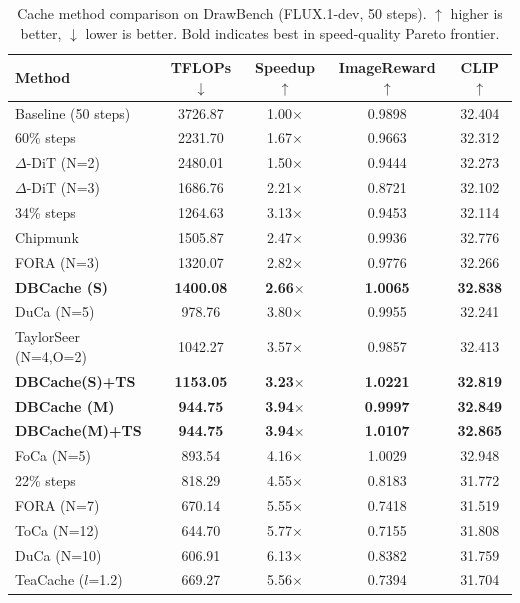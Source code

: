 \documentclass[10pt]{article}
\begin{document}
\begin{table}[htbp]
\centering
\caption{Cache method comparison on DrawBench (FLUX.1-dev, 50 steps). $\uparrow$ higher is better, $\downarrow$ lower is better. Bold indicates best in speed-quality Pareto frontier.}
\label{tab:cache_sota}
{\small
\begin{tabular}{lcccc}
\toprule
\textbf{Method} & \textbf{TFLOPs}$\downarrow$ & \textbf{Speedup}$\uparrow$ & \textbf{ImageReward}$\uparrow$ & \textbf{CLIP}$\uparrow$ \\
\midrule
Baseline (50 steps) & 3726.87 & 1.00$\times$ & 0.9898 & 32.404 \\
60\% steps & 2231.70 & 1.67$\times$ & 0.9663 & 32.312 \\
$\Delta$-DiT (N=2) & 2480.01 & 1.50$\times$ & 0.9444 & 32.273 \\
$\Delta$-DiT (N=3) & 1686.76 & 2.21$\times$ & 0.8721 & 32.102 \\
34\% steps & 1264.63 & 3.13$\times$ & 0.9453 & 32.114 \\
Chipmunk & 1505.87 & 2.47$\times$ & 0.9936 & 32.776 \\
FORA (N=3) & 1320.07 & 2.82$\times$ & 0.9776 & 32.266 \\
\textbf{DBCache (S)} & \textbf{1400.08} & \textbf{2.66$\times$} & \textbf{1.0065} & \textbf{32.838} \\
DuCa (N=5) & 978.76 & 3.80$\times$ & 0.9955 & 32.241 \\
TaylorSeer (N=4,O=2) & 1042.27 & 3.57$\times$ & 0.9857 & 32.413 \\
\textbf{DBCache(S)+TS} & \textbf{1153.05} & \textbf{3.23$\times$} & \textbf{1.0221} & \textbf{32.819} \\
\textbf{DBCache (M)} & \textbf{944.75} & \textbf{3.94$\times$} & \textbf{0.9997} & \textbf{32.849} \\
\textbf{DBCache(M)+TS} & \textbf{944.75} & \textbf{3.94$\times$} & \textbf{1.0107} & \textbf{32.865} \\
FoCa (N=5) & 893.54 & 4.16$\times$ & 1.0029 & 32.948 \\
22\% steps & 818.29 & 4.55$\times$ & 0.8183 & 31.772 \\
FORA (N=7) & 670.14 & 5.55$\times$ & 0.7418 & 31.519 \\
ToCa (N=12) & 644.70 & 5.77$\times$ & 0.7155 & 31.808 \\
DuCa (N=10) & 606.91 & 6.13$\times$ & 0.8382 & 31.759 \\
TeaCache ($l$=1.2) & 669.27 & 5.56$\times$ & 0.7394 & 31.704 \\

\end{tabular}}
\end{table}
\end{document}

